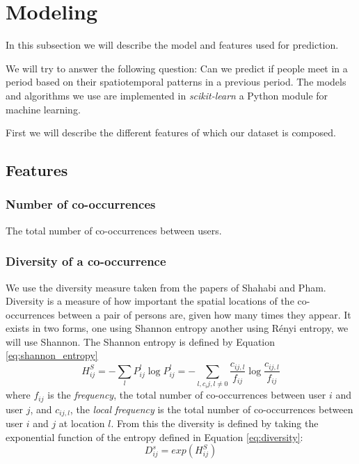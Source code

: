 \section{Modeling}
In this subsection we will describe the model and features used for prediction.

We will try to answer the following question: Can we predict if people meet in a period based on their spatiotemporal patterns in a previous period.
The models and algorithms we use are implemented in \textit{scikit-learn}\cite{scikit-learn} a Python module for machine learning. 

First we will describe the different features of which our dataset is composed.
\subsection{Features}
\subsubsection{Number of co-occurrences}
The total number of co-occurrences between users.
\subsubsection{Diversity of a co-occurrence}
We use the diversity measure taken from the papers of Shahabi and Pham\cite{iRWRfSD}\cite{AEBMtISSfSD}.
Diversity is a measure of how important the spatial locations of the co-occurrences between a pair of persons are, given how many times they appear.
It exists in two forms, one using Shannon entropy another using Rényi entropy, we will use Shannon.
The Shannon entropy is defined by Equation \ref{eq:shannon_entropy}
\begin{equation}
\label{eq:shannon_entropy}
H^S_{ij}=-\sum\limits_{l}P^l_{ij} \log P^l_{ij}= -\sum\limits_{l,c_ij,l\neq 0}\frac{c_{ij,l}}{f_{ij}}\log \frac{c_{ij,l}}{f_{ij}}
\end{equation}
where $f_{ij}$ is the \textit{frequency}, the total number of co-occurrences between user $i$ and user $j$, and $c_{ij,l}$, the \textit{local frequency} is the total number of co-occurrences between user $i$ and $j$ at location $l$.
From this the diversity is defined by taking the exponential function of the entropy defined in Equation \ref{eq:diversity}:
\begin{equation}
\label{eq:diversity}
D^s_{ij} = exp(H^S_{ij})
\end{equation}

